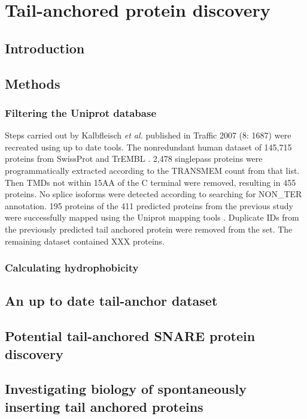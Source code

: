 \chapter{Tail-anchored protein discovery} %
\section{Introduction}
\section{Methods}
\subsection{Filtering the Uniprot database}
Steps carried out by Kalbfleisch {\it et al.} published in Traffic 2007 (8: 1687) were recreated using up to date tools. The non\-redundant human dataset of 145,715 proteins from SwissProt and TrEMBL \cite{Kalbfleisch2007, TheUniProtConsortium2014}. 2,478 singlepass proteins were programmatically extracted according to the TRANSMEM count from that list. Then TMDs not within 15AA of the C terminal were removed, resulting in 455 proteins. No splice isoforms were detected according to searching for NON\_TER annotation. 195 proteins of the 411 predicted proteins from the previous study were successfully mapped using the Uniprot mapping tools \cite{Kalbfleisch2007, TheUniProtConsortium2014}. Duplicate IDs from the previously predicted tail anchored protein were removed from the set. The remaining dataset contained XXX proteins.

\subsection{Calculating hydrophobicity}

\section{An up to date tail-anchor dataset}

\section{Potential tail-anchored SNARE protein discovery}

\section{Investigating biology of spontaneously inserting tail anchored proteins}
